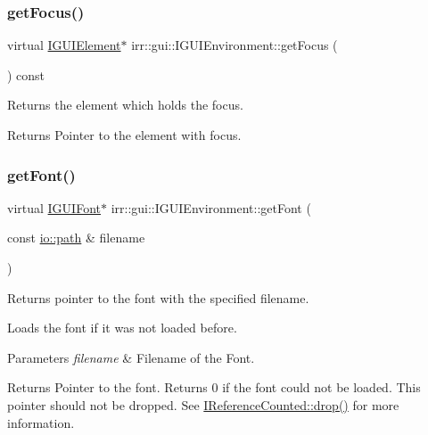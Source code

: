\subsubsection{\texorpdfstring{get\+Focus()}{getFocus()}}
{\footnotesize\ttfamily virtual \hyperlink{classirr_1_1gui_1_1IGUIElement}{I\+G\+U\+I\+Element}$\ast$ irr\+::gui\+::\+I\+G\+U\+I\+Environment\+::get\+Focus (\begin{DoxyParamCaption}{ }\end{DoxyParamCaption}) const\hspace{0.3cm}{\ttfamily [pure virtual]}}



Returns the element which holds the focus. 

\begin{DoxyReturn}{Returns}
Pointer to the element with focus. 
\end{DoxyReturn}
\mbox{\label{classirr_1_1gui_1_1IGUIEnvironment_a22074f9a1a5a86d5d216126bbb90b3b1}} 
\subsubsection{\texorpdfstring{get\+Font()}{getFont()}}
{\footnotesize\ttfamily virtual \hyperlink{classirr_1_1gui_1_1IGUIFont}{I\+G\+U\+I\+Font}$\ast$ irr\+::gui\+::\+I\+G\+U\+I\+Environment\+::get\+Font (\begin{DoxyParamCaption}\item[{const \hyperlink{namespaceirr_1_1io_ab1bdc45edb3f94d8319c02bc0f840ee1}{io\+::path} \&}]{filename }\end{DoxyParamCaption})\hspace{0.3cm}{\ttfamily [pure virtual]}}



Returns pointer to the font with the specified filename. 

Loads the font if it was not loaded before. 
\begin{DoxyParams}{Parameters}
{\em filename} & Filename of the Font. \\
\hline
\end{DoxyParams}
\begin{DoxyReturn}{Returns}
Pointer to the font. Returns 0 if the font could not be loaded. This pointer should not be dropped. See \hyperlink{classirr_1_1IReferenceCounted_a03856a09355b89d178090c4a5f738543}{I\+Reference\+Counted\+::drop()} for more information. 
\end{DoxyReturn}
\mbox{\label{classirr_1_1gui_1_1IGUIEnvironment_a3c1ec1c13e7339e2e8abb34276d6288f}} 
